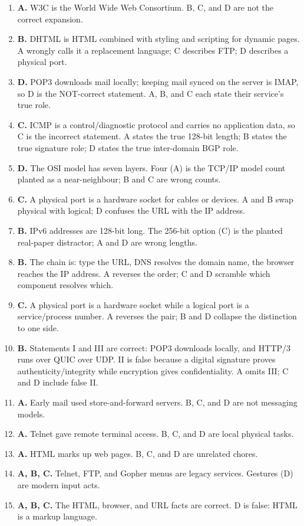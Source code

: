 \documentclass[11pt]{article}
\begin{document}
\begin{enumerate}[label=\textbf{Q\arabic*.}, leftmargin=*]
\item \textbf{A.} W3C is the World Wide Web Consortium. B, C, and D are not
  the correct expansion.
\item \textbf{B.} DHTML is HTML combined with styling and scripting for
  dynamic pages. A wrongly calls it a replacement language; C describes FTP;
  D describes a physical port.
\item \textbf{D.} POP3 downloads mail locally; keeping mail synced on the
  server is IMAP, so D is the NOT-correct statement. A, B, and C each state
  their service's true role.
\item \textbf{C.} ICMP is a control/diagnostic protocol and carries no
  application data, so C is the incorrect statement. A states the true
  128-bit length; B states the true signature role; D states the true
  inter-domain BGP role.
\item \textbf{D.} The OSI model has seven layers. Four (A) is the TCP/IP
  model count planted as a near-neighbour; B and C are wrong counts.
\item \textbf{C.} A physical port is a hardware socket for cables or devices.
  A and B swap physical with logical; D confuses the URL with the IP
  address.
\item \textbf{B.} IPv6 addresses are 128-bit long. The 256-bit option (C) is
  the planted real-paper distractor; A and D are wrong lengths.
\item \textbf{B.} The chain is: type the URL, DNS resolves the domain name,
  the browser reaches the IP address. A reverses the order; C and D scramble
  which component resolves which.
\item \textbf{C.} A physical port is a hardware socket while a logical port
  is a service/process number. A reverses the pair; B and D collapse the
  distinction to one side.
\item \textbf{B.} Statements I and III are correct: POP3 downloads locally,
  and HTTP/3 runs over QUIC over UDP. II is false because a digital
  signature proves authenticity/integrity while encryption gives
  confidentiality. A omits III; C and D include false II.

\item \textbf{A.} Early mail used store-and-forward servers. B, C, and D are not messaging models.
\item \textbf{A.} Telnet gave remote terminal access. B, C, and D are local physical tasks.
\item \textbf{A.} HTML marks up web pages. B, C, and D are unrelated chores.
\item \textbf{A, B, C.} Telnet, FTP, and Gopher menus are legacy services. Gestures (D) are modern input acts.
\item \textbf{A, B, C.} The HTML, browser, and URL facts are correct. D is false: HTML is a markup language.
\end{enumerate}
\def\JKSSBLessonID{53}\def\JKSSBAnswers{1}
\end{document}
